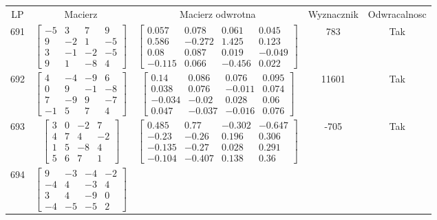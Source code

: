 \documentclass[a4paper,12pt]{article}
\begin{document}
\bgroup {} \vspace{0.2in} \begin{tabular}{c c c c c}
LP & Macierz & Macierz odwrotna & Wyznacznik & Odwracalnosc\\
691
&
$\begin{bmatrix} -5 & 3 & 7 & 9 \\ 9 & -2 & 1 & -5 \\ 3 & -1 & -2 & -5 \\ 9 & 1 & -8 & 4 \end{bmatrix}$
&
$\begin{bmatrix} 0.057 & 0.078 & 0.061 & 0.045 \\ 0.586 & -0.272 & 1.425 & 0.123 \\ 0.08 & 0.087 & 0.019 & -0.049 \\ -0.115 & 0.066 & -0.456 & 0.022 \end{bmatrix}$
&
783
&
Tak
\\
692
&
$\begin{bmatrix} 4 & -4 & -9 & 6 \\ 0 & 9 & -1 & -8 \\ 7 & -9 & 9 & -7 \\ -1 & 5 & 7 & 4 \end{bmatrix}$
&
$\begin{bmatrix} 0.14 & 0.086 & 0.076 & 0.095 \\ 0.038 & 0.076 & -0.011 & 0.074 \\ -0.034 & -0.02 & 0.028 & 0.06 \\ 0.047 & -0.037 & -0.016 & 0.076 \end{bmatrix}$
&
11601
&
Tak
\\
693
&
$\begin{bmatrix} 3 & 0 & -2 & 7 \\ 4 & 7 & 4 & -2 \\ 1 & 5 & -8 & 4 \\ 5 & 6 & 7 & 1 \end{bmatrix}$
&
$\begin{bmatrix} 0.485 & 0.77 & -0.302 & -0.647 \\ -0.23 & -0.26 & 0.196 & 0.306 \\ -0.135 & -0.27 & 0.028 & 0.291 \\ -0.104 & -0.407 & 0.138 & 0.36 \end{bmatrix}$
&
-705
&
Tak
\\
694
&
$\begin{bmatrix} 9 & -3 & -4 & -2 \\ -4 & 4 & -3 & 4 \\ 3 & 4 & -9 & 0 \\ -4 & -5 & -5 & 2 \end{bmatrix}$

\end{tabular}
\end{document}
